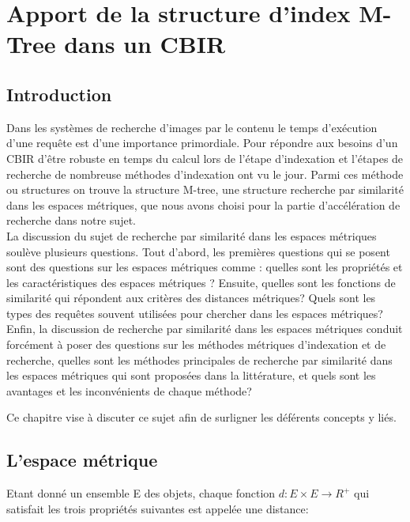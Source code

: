 
\chapter{Apport de la structure d’index M-Tree dans un CBIR} %

\label{ChapterX} %


\section{Introduction}
Dans les systèmes de recherche d'images par le contenu le temps d'exécution d'une requête est d'une importance primordiale. Pour répondre aux besoins d'un CBIR d'être robuste en temps du calcul lors de l'étape d'indexation et l'étapes de recherche de nombreuse méthodes d'indexation ont vu le jour. Parmi ces méthode ou structures on trouve la structure M-tree, une structure recherche par similarité dans les espaces métriques, que nous avons choisi pour la partie d'accélération de recherche dans notre sujet. \\
 
La discussion du sujet de recherche par similarité dans les espaces métriques soulève plusieurs questions. Tout d’abord, les premières questions qui se posent sont des questions sur les espaces métriques comme : quelles sont les propriétés et les caractéristiques des espaces
métriques ? Ensuite, quelles sont les fonctions de similarité qui répondent aux critères des distances métriques? Quels sont les types des requêtes souvent utilisées pour chercher dans les espaces métriques?\\

Enfin, la discussion de recherche par similarité dans les espaces métriques conduit forcément à poser des questions sur les méthodes métriques d’indexation et de recherche, quelles sont les méthodes principales de recherche par similarité dans les espaces métriques
qui sont proposées dans la littérature, et quels sont les avantages et les inconvénients de chaque méthode?

Ce chapitre vise à discuter ce sujet afin de surligner les déférents concepts y liés.
\section{L’espace métrique}
Etant donné un ensemble E des objets, chaque fonction $d: E\times E\rightarrow R^+$ qui satisfait les trois propriétés suivantes est appelée une distance:

